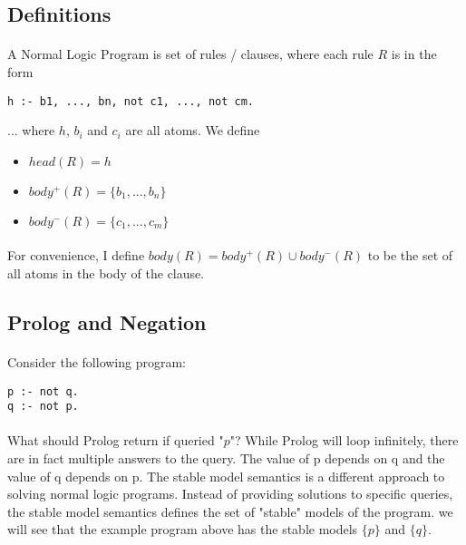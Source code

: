\documentclass{article}
\theoremstyle{plain}
\theoremstyle{definition}
\begin{document}
\begin{multicols}{2}
\subsection{Definitions}

\paragraph{} A Normal Logic Program is set of rules / clauses, where each rule $R$ is in the form

\begin{lstlisting}
h :- b1, ..., bn, not c1, ..., not cm.
\end{lstlisting}

\noindent ... where $h$, $b_i$ and $c_i$ are all atoms. We define 

\begin{itemize}
\item $head(R) = h$
\item $body^+(R) = \{ b_1, ..., b_n \}$
\item $body^-(R) = \{ c_1, ..., c_m \}$
\end{itemize}

\paragraph{} For convenience, I define $body(R) = body^+(R) \cup body^-(R)$ to be the set of all atoms in the body of the clause.

\subsection{Prolog and Negation}

\paragraph{} Consider the following program:

\begin{lstlisting}
p :- not q.
q :- not p.
\end{lstlisting}

\paragraph{} What should Prolog return if queried "$p$"? While Prolog will loop infinitely, there are in fact multiple answers to the query. The value of p depends on q and the value of q depends on p. The stable model semantics\cite{gelfond88} is a different approach to solving normal logic programs. Instead of providing solutions to specific queries, the stable model semantics defines the set of "stable" models of the program. we will see that the example program above has the stable models $\{p\}$ and $\{q\}$.


\end{multicols}
\end{document}
